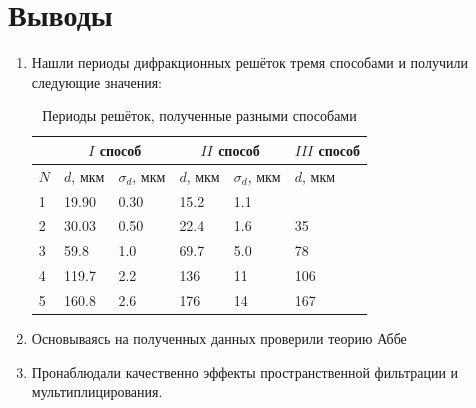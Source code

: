 \documentclass[a4paper,12pt]{article} %
\begin{document}
\section{Выводы}

\begin{enumerate}
\item Нашли периоды дифракционных решёток тремя способами и получили следующие значения:

\begin{table}[h]
\centering
\begin{tabular}{|l|ll|ll|l|}
\hline
    & \multicolumn{2}{c|}{$I$ способ}                 & \multicolumn{2}{c|}{$II$ способ}                & \multicolumn{1}{c|}{$III$ способ} \\ \hline
$N$ & \multicolumn{1}{l|}{$d$, мкм} & $\sigma_d$, мкм & \multicolumn{1}{l|}{$d$, мкм} & $\sigma_d$, мкм & $d$, мкм                          \\ \hline
1 & \multicolumn{1}{l|}{19.90} & 0.30 & \multicolumn{1}{l|}{15.2} & 1.1 &     \\ \hline
2 & \multicolumn{1}{l|}{30.03} & 0.50 & \multicolumn{1}{l|}{22.4} & 1.6 & 35  \\ \hline
3 & \multicolumn{1}{l|}{59.8}  & 1.0  & \multicolumn{1}{l|}{69.7} & 5.0 & 78  \\ \hline
4 & \multicolumn{1}{l|}{119.7} & 2.2  & \multicolumn{1}{l|}{136}  & 11  & 106 \\ \hline
5 & \multicolumn{1}{l|}{160.8} & 2.6  & \multicolumn{1}{l|}{176}  & 14  & 167 \\ \hline
\end{tabular}
\caption{Периоды решёток, полученные разными способами}
\label{tab:mets}
\end{table}

\item Основываясь на полученных данных проверили теорию Аббе

\item Пронаблюдали качественно эффекты пространственной фильтрации и мультиплицирования.

\end{enumerate}
\end{document}
